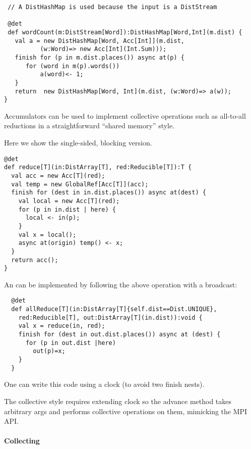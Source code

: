 \begin{example}
\begin{lstlisting}
 // A DistHashMap is used because the input is a DistStream

 @det
 def wordCount(m:DistStream[Word]):DistHashMap[Word,Int](m.dist) {
   val a = new DistHashMap[Word, Acc[Int]](m.dist,
          (w:Word)=> new Acc[Int](Int.Sum)));
   finish for (p in m.dist.places()) async at(p) {
      for (word in m(p).words())
          a(word)<- 1;
   }
   return  new DistHashMap[Word, Int](m.dist, (w:Word)=> a(w));
}
\end{lstlisting}

\end{example}


Accumulators can be used to implement collective operations such as
all-to-all reductions in a straightforward ``shared memory'' style.

Here we show the single-sided, blocking version.
\begin{example}
  \begin{lstlisting}
@det
def reduce[T](in:DistArray[T], red:Reducible[T]):T {
  val acc = new Acc[T](red);
  val temp = new GlobalRef[Acc[T]](acc);
  finish for (dest in in.dist.places()) async at(dest) {
    val local = new Acc[T](red);
    for (p in in.dist | here) {
      local <- in(p);
    }
    val x = local();
    async at(origin) temp() <- x;
  }
  return acc();
}
\end{lstlisting}
\end{example}

An  can be implemented by following the above
operation with a broadcast:
\begin{lstlisting}
  @det
  def allReduce[T](in:DistArray[T]{self.dist==Dist.UNIQUE},
    red:Reducible[T], out:DistArray[T](in.dist)):void {
    val x = reduce(in, red);
    finish for (dest in out.dist.places()) async at (dest) {
      for (p in out.dist |here)
        out(p)=x;
    }
  }
\end{lstlisting}
One can write this code using a clock (to avoid two finish nests).

The collective style requires extending clock so the advance method
takes arbitrary args and performs collective operations on them,
mimicking the MPI API.

\paragraph{Collecting }

